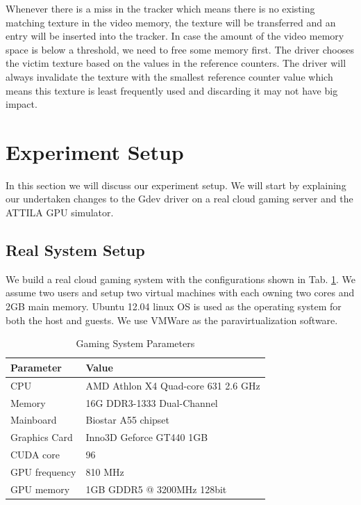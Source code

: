 \documentclass[pageno]{jpaper}
\begin{document}
Whenever there is a miss in the tracker which means there is no existing matching texture in the video memory, the texture will be transferred and an entry will be inserted into the tracker. In case the amount of the video memory space is below a threshold, we need to free some memory first. The driver chooses the victim texture based on the values in the reference counters. The driver will always invalidate the texture with the smallest reference counter value which means this texture is least frequently used and discarding it may not have big impact.

\section{Experiment Setup}\label{sec:details}

In this section we will discuss our experiment setup. We will start by
explaining our undertaken changes to the Gdev driver on a real cloud gaming server and the ATTILA GPU simulator.

\subsection{Real System Setup}
We build a real cloud gaming system with the configurations shown in Tab. \ref{table:simulationPC}. We assume two users and setup two virtual machines with each owning two cores and 2GB main memory. Ubuntu 12.04 linux OS is used as the operating system for both the host and
guests. We use VMWare \cite{vm} as the paravirtualization software.


 \begin{table}[h!]
	\centering
	\begin{tabular}{|l|l|}
		\hline
		\textbf{Parameter} & \textbf{Value} \\
		\hline
		\hline
		CPU & AMD Athlon X4 Quad-core 631 2.6 GHz \\
		\hline
		Memory & 16G DDR3-1333 Dual-Channel \\
		\hline
		Mainboard & Biostar A55 chipset \\
		\hline
		Graphics Card & Inno3D Geforce GT440 1GB \\
		\hline
		CUDA core & 96 \\
		\hline
		GPU frequency & 810 MHz \\
		\hline
		GPU memory & 1GB GDDR5 @ 3200MHz 128bit \\
		\hline
	\end{tabular}
	\caption{Gaming System Parameters}
	\label{table:simulationPC}
\end{table}
\end{document}
